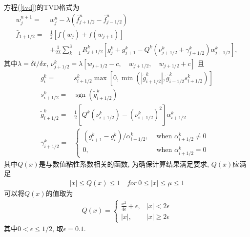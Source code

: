 \documentclass[10.5pt
]{article}
\begin{document}
方程(\ref{tvd})的TVD格式为\citep{Harten1983}
\begin{align}
w_{j}^{n+1}=&w_{j}^{n}-\lambda\left(\bar{f}_{j+1 / 2}^{n}-\bar{f}_{j-1 / 2}^{n}\right)
\\
\bar{f}_{1+1 / 2}=&
\frac{1}{2}\left[f\left(w_{j}\right)+f\left(w_{j+1}\right)\right] \nonumber
\\ &+\frac{1}{2 \lambda} \sum_{k=1}^{3} R_{j+1 / 2}^{k}\left[g_{j}^{k}+g_{j+1}^{k}-Q^{k}\left(\nu_{j+1 / 2}^{k}+\gamma_{j+1 / 2}^{k}\right) \alpha_{j+1 / 2}^{k}\right],
\end{align}
其中$\lambda=\delta t/\delta x$, $\nu_{j+1 / 2}^{k}=\lambda \left[w_{j+1/2}-c,\quad w_{j+1/2},\quad w_{j+1/2}+c \right]$ 且
\begin{align}
g_{i}^{k}=& s_{i+1 / 2}^{k} \max \left[0, \min \left(\left|\tilde{g}_{i+1 / 2}^{k}\right|, \tilde{g}_{i-1 / 2}^{k} s_{i+1 / 2}^{k}\right)\right] \\
s_{i+1 / 2}^{k}=&\operatorname{sgn}\left(\tilde{g}_{i+1 / 2}^{k}\right) \\ 
\tilde{g}_{i+1 / 2}^{k}=&\frac{1}{2}\left[Q^{k}\left(\nu_{i+1 / 2}^{k}\right)-\left(\nu_{i+1 / 2}^{k}\right)^{2}\right] \alpha_{i+1 / 2}^{k} \\ 
\gamma_{i+1 / 2}^{k}=&\left\{\begin{array}{ll}{\left(g_{i+1}^{k}-g_{i}^{k}\right) / \alpha_{i+1 / 2}^{k},} & {\text { when } \alpha_{i+1 / 2}^{k} \neq 0} \\ {0,} & {\text { when } \alpha_{i+1 / 2}^{k}=0}\end{array}\right.
\end{align}
其中$Q(x)$是与数值粘性系数相关的函数, 为确保计算结果满足要求, $Q(x)$应满足
\begin{align}
	|x| \leq Q(x) \leq 1 \quad for\ 0 \leq |x| \leq \mu \leq 1
\end{align}
可以将$Q(x)$的值取为
\begin{align}
Q(x)=\left\{\begin{array}{ll}{\frac{x^{2}}{4 \epsilon}+\epsilon,} & {|x|<2 \epsilon} \\ {|x|,} & {|x| \geq 2 \epsilon}\end{array}\right.
\end{align}
其中$0< \epsilon \leq 1/2$, 取$\epsilon=0.1$.
\end{document}
